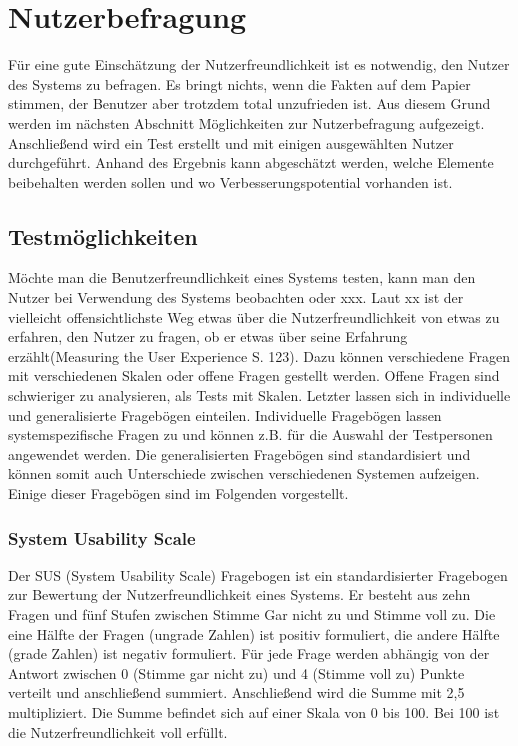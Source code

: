 \section{Nutzerbefragung}
Für eine gute Einschätzung der Nutzerfreundlichkeit ist es notwendig, den Nutzer des Systems zu befragen. Es bringt nichts, wenn die Fakten auf dem Papier stimmen, der Benutzer aber trotzdem total unzufrieden ist. Aus diesem Grund werden im nächsten Abschnitt Möglichkeiten zur Nutzerbefragung aufgezeigt. Anschließend wird ein Test erstellt und mit einigen ausgewählten Nutzer durchgeführt. Anhand des Ergebnis kann abgeschätzt werden, welche Elemente beibehalten werden sollen und wo Verbesserungspotential vorhanden ist.

\subsection{Testmöglichkeiten}
Möchte man die Benutzerfreundlichkeit eines Systems testen, kann man den Nutzer bei Verwendung des Systems beobachten oder xxx. Laut xx ist \glqq der vielleicht offensichtlichste Weg etwas über die Nutzerfreundlichkeit von etwas zu erfahren, den Nutzer zu fragen, ob er etwas über seine Erfahrung erzählt\grqq(Measuring the User Experience S. 123). Dazu können verschiedene Fragen mit verschiedenen Skalen oder offene Fragen gestellt werden. Offene Fragen sind schwieriger zu analysieren, als Tests mit Skalen. Letzter lassen sich in individuelle und generalisierte Fragebögen einteilen. Individuelle Fragebögen lassen systemspezifische Fragen zu und können z.B. für die Auswahl der Testpersonen angewendet werden. Die generalisierten Fragebögen sind standardisiert und können somit auch Unterschiede zwischen verschiedenen Systemen aufzeigen. Einige dieser Fragebögen sind im Folgenden vorgestellt.

\subsubsection*{System Usability Scale}
Der SUS (System Usability Scale) Fragebogen ist ein standardisierter Fragebogen zur Bewertung der Nutzerfreundlichkeit eines Systems. Er besteht aus zehn Fragen und fünf Stufen zwischen Stimme Gar nicht zu und Stimme voll zu. Die eine Hälfte der Fragen (ungrade Zahlen) ist positiv formuliert, die andere Hälfte (grade Zahlen) ist negativ formuliert. Für jede Frage werden abhängig von der Antwort zwischen 0 (Stimme gar nicht zu) und 4 (Stimme voll zu) Punkte verteilt und anschließend summiert. Anschließend wird die Summe mit 2,5 multipliziert. Die Summe befindet sich auf einer Skala von 0 bis 100. Bei 100 ist die Nutzerfreundlichkeit voll erfüllt. 

